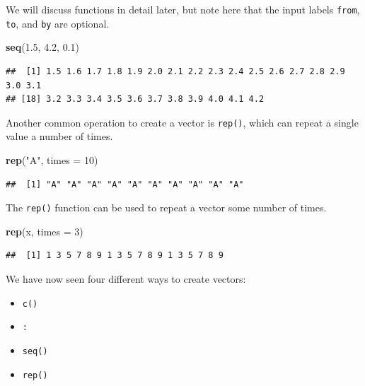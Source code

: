 \documentclass[]{book}
\newenvironment{Shaded}{\begin{snugshade}}{\end{snugshade}}
\newcommand{\KeywordTok}[1]{\textcolor[rgb]{0.13,0.29,0.53}{\textbf{#1}}}
\newcommand{\DataTypeTok}[1]{\textcolor[rgb]{0.13,0.29,0.53}{#1}}
\newcommand{\DecValTok}[1]{\textcolor[rgb]{0.00,0.00,0.81}{#1}}
\newcommand{\FloatTok}[1]{\textcolor[rgb]{0.00,0.00,0.81}{#1}}
\newcommand{\StringTok}[1]{\textcolor[rgb]{0.31,0.60,0.02}{#1}}
\newcommand{\NormalTok}[1]{#1}
\providecommand{\tightlist}{%
  \setlength{\itemsep}{0pt}\setlength{\parskip}{0pt}}
\theoremstyle{definition}
\theoremstyle{definition}
\theoremstyle{definition}
\theoremstyle{remark}
\begin{document}
We will discuss functions in detail later, but note here that the input
labels \texttt{from}, \texttt{to}, and \texttt{by} are optional.

\begin{Shaded}
\begin{Highlighting}[]
\KeywordTok{seq}\NormalTok{(}\FloatTok{1.5}\NormalTok{, }\FloatTok{4.2}\NormalTok{, }\FloatTok{0.1}\NormalTok{)}
\end{Highlighting}
\end{Shaded}

\begin{verbatim}
##  [1] 1.5 1.6 1.7 1.8 1.9 2.0 2.1 2.2 2.3 2.4 2.5 2.6 2.7 2.8 2.9 3.0 3.1
## [18] 3.2 3.3 3.4 3.5 3.6 3.7 3.8 3.9 4.0 4.1 4.2
\end{verbatim}

Another common operation to create a vector is \texttt{rep()}, which can
repeat a single value a number of times.

\begin{Shaded}
\begin{Highlighting}[]
\KeywordTok{rep}\NormalTok{(}\StringTok{"A"}\NormalTok{, }\DataTypeTok{times =} \DecValTok{10}\NormalTok{)}
\end{Highlighting}
\end{Shaded}

\begin{verbatim}
##  [1] "A" "A" "A" "A" "A" "A" "A" "A" "A" "A"
\end{verbatim}

The \texttt{rep()} function can be used to repeat a vector some number
of times.

\begin{Shaded}
\begin{Highlighting}[]
\KeywordTok{rep}\NormalTok{(x, }\DataTypeTok{times =} \DecValTok{3}\NormalTok{)}
\end{Highlighting}
\end{Shaded}

\begin{verbatim}
##  [1] 1 3 5 7 8 9 1 3 5 7 8 9 1 3 5 7 8 9
\end{verbatim}

We have now seen four different ways to create vectors:

\begin{itemize}
\tightlist
\item
  \texttt{c()}
\item
  \texttt{:}
\item
  \texttt{seq()}
\item
  \texttt{rep()}
\end{itemize}
\end{document}
